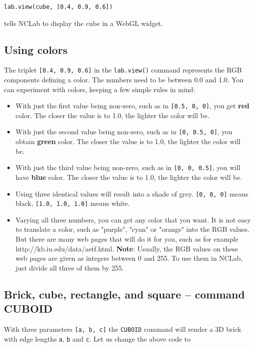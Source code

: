 \documentclass[article,A4,12pt]{llncs}
\begin{document}
\begin{verbatim}
lab.view(cube, [0.4, 0.9, 0.6])
\end{verbatim}
tells NCLab to display the cube in a WebGL widget. 

\subsection{Using colors}

The triplet {\tt [0.4, 0.9, 0.6]} in the {\tt lab.view()} command
represents the RGB components defining a color. The numbers need to be between 
0.0 and 1.0. You can experiment with colors, keeping a few simple rules in mind:

\begin{itemize}
\item With just the first value being non-zero, such as in {\tt [0.5, 0, 0]},
      you get {\bf red} color. The closer the value is to 1.0, the lighter the color
      will be.
\item With just the second value being non-zero, such as in {\tt [0, 0.5, 0]},
      you obtain {\bf green} color. The closer the  value is to 1.0, the lighter the color
      will be.
\item With just the third value being non-zero, such as in {\tt [0, 0, 0.5]},
      you will have {\bf blue} color. The closer the  value is to 1.0, the lighter the color
      will be.
\item Using three identical values will result into a shade of grey. {\tt [0, 0, 0]}
      means black, {\tt [1.0, 1.0, 1.0]} means white.
\item Varying all three numbers, you can get any color that you want. It is not 
      easy to translate a color, such as "purple", "cyan" or "orange" into the RGB
      values. But there are many web pages that will do it for you, such as for
      example http://kb.iu.edu/data/aetf.html. {\bf Note}: Usually,
      the RGB values on these web pages are given as integers between 0 and 255. To use them in NCLab,
      just divide all three of them by 255.
\end{itemize}

 
\subsection{Brick, cube, rectangle, and square -- command CUBOID}

With three parameters {\tt [a, b, c]} the {\tt CUBOID} command will render 
a 3D brick with edge lengths {\tt a}, {\tt b} and {\tt c}. Let us change the 
above code to  
\end{document}
